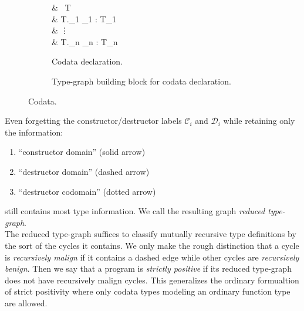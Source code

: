 \begin{figure}[h]
  \begin{subfigure}[b]{0.3\textwidth}
    \begin{codealign}
      &
        \codata\ T\ \where
      \\[-4pt]
      &\quad
        T._{1} \Delta_{1} : T_{1}
      \\[-4pt]
      &\quad\quad\quad
        \vdots
      \\[-4pt]
      &\quad
        T._{n} \Delta_{n} : T_{n}
    \end{codealign}
    \caption{Codata declaration.}
    \label{fig:mainideas:codatatg:codata}
  \end{subfigure}
  \begin{subfigure}[b]{0.6\textwidth}
    \caption{Type-graph building block for codata declaration.}
    \label{fig:mainideas:codatatg:tg}
  \end{subfigure}
  \caption{Codata.}
  \label{fig:mainideas:codatatg}
\end{figure}

Even forgetting the constructor/destructor labels $\mathcal{C}_{i}$ and $\mathcal{D}_{i}$ while retaining only the information:
\begin{enumerate}
  \item
    \enquote{constructor domain} (solid arrow)
  \item
    \enquote{destructor domain} (dashed arrow)
  \item
    \enquote{destructor codomain} (dotted arrow)
\end{enumerate}
still contains most type information.
We call the resulting graph \textit{reduced type-graph}.
\\
The reduced type-graph suffices to classify mutually recursive type definitions by the sort of the cycles it contains.
We only make the rough distinction that a cycle is \textit{recursively malign} if it contains a dashed edge while other cycles are \textit{recursively benign}.
Then we say that a program is \textit{strictly positive} if its reduced type-graph does not have recursively malign cycles.
This generalizes the ordinary formualtion of strict positivity where only codata types modeling an ordinary function type are allowed.

